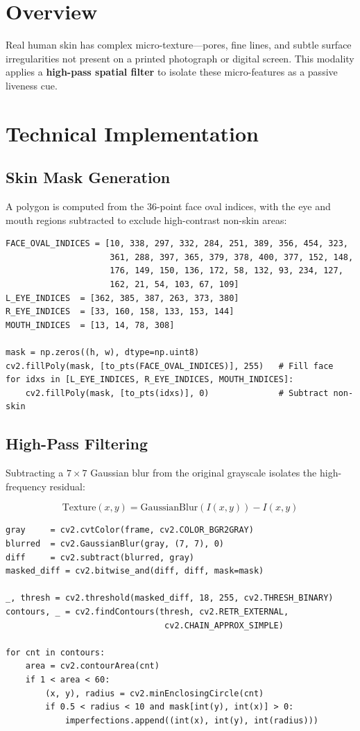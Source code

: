 \documentclass[12pt,a4paper]{report}
\begin{document}
\section{Overview}
Real human skin has complex micro-texture---pores, fine lines, and subtle surface irregularities not present on a printed photograph or digital screen. This modality applies a \textbf{high-pass spatial filter} to isolate these micro-features as a passive liveness cue.

\section{Technical Implementation}

\subsection{Skin Mask Generation}
A polygon is computed from the 36-point face oval indices, with the eye and mouth regions subtracted to exclude high-contrast non-skin areas:

\begin{lstlisting}[style=pythonstyle, caption={Skin Mask Construction --- Facial\_Texture\_Modality.py}]
FACE_OVAL_INDICES = [10, 338, 297, 332, 284, 251, 389, 356, 454, 323,
                     361, 288, 397, 365, 379, 378, 400, 377, 152, 148,
                     176, 149, 150, 136, 172, 58, 132, 93, 234, 127,
                     162, 21, 54, 103, 67, 109]
L_EYE_INDICES  = [362, 385, 387, 263, 373, 380]
R_EYE_INDICES  = [33, 160, 158, 133, 153, 144]
MOUTH_INDICES  = [13, 14, 78, 308]

mask = np.zeros((h, w), dtype=np.uint8)
cv2.fillPoly(mask, [to_pts(FACE_OVAL_INDICES)], 255)   # Fill face
for idxs in [L_EYE_INDICES, R_EYE_INDICES, MOUTH_INDICES]:
    cv2.fillPoly(mask, [to_pts(idxs)], 0)              # Subtract non-skin
\end{lstlisting}

\subsection{High-Pass Filtering}
Subtracting a $7 \times 7$ Gaussian blur from the original grayscale isolates the high-frequency residual:

\[
\text{Texture}(x,y) = \text{GaussianBlur}(I(x,y)) - I(x,y)
\]

\begin{lstlisting}[style=pythonstyle, caption={High-Pass Filter and Imperfection Detection}]
gray     = cv2.cvtColor(frame, cv2.COLOR_BGR2GRAY)
blurred  = cv2.GaussianBlur(gray, (7, 7), 0)
diff     = cv2.subtract(blurred, gray)
masked_diff = cv2.bitwise_and(diff, diff, mask=mask)

_, thresh = cv2.threshold(masked_diff, 18, 255, cv2.THRESH_BINARY)
contours, _ = cv2.findContours(thresh, cv2.RETR_EXTERNAL,
                                cv2.CHAIN_APPROX_SIMPLE)

for cnt in contours:
    area = cv2.contourArea(cnt)
    if 1 < area < 60:
        (x, y), radius = cv2.minEnclosingCircle(cnt)
        if 0.5 < radius < 10 and mask[int(y), int(x)] > 0:
            imperfections.append((int(x), int(y), int(radius)))
\end{lstlisting}
\end{document}
